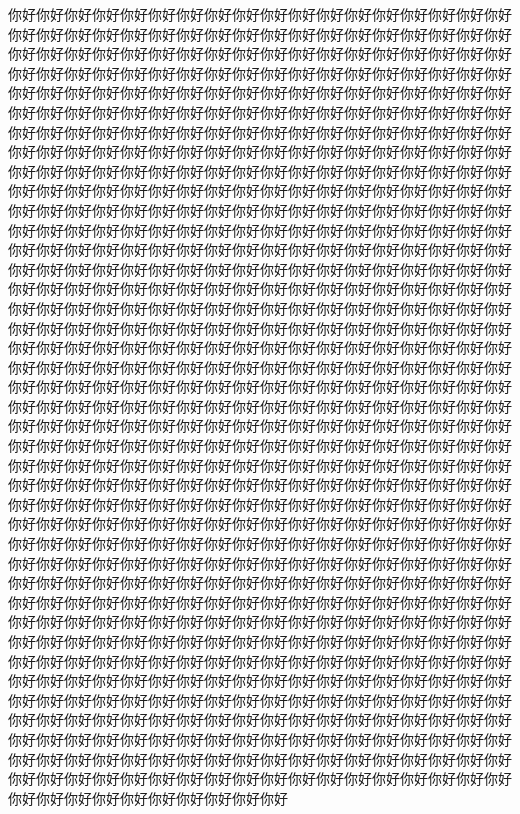 \documentclass[doctor,UTF8,hyperref]{../Template/scuthesis}
\begin{document}
\maketitle
你好你好你好你好你好你好你好你好你好你好你好你好你好你好你好你好你好你好你好你好你好你好你好你好你好你好你好你好你好你好你好你好你好你好你好你好你好你好你好你好你好你好你好你好你好你好你好你好你好你好你好你好你好你好你好你好你好你好你好你好你好你好你好你好你好你好你好你好你好你好你好你好你好你好你好你好你好你好你好你好你好你好你好你好你好你好你好你好你好你好你好你好你好你好你好你好你好你好你好你好你好你好你好你好你好你好你好你好你好你好你好你好你好你好你好你好你好你好你好你好你好你好你好你好你好你好你好你好你好你好你好你好你好你好你好你好你好你好你好你好你好你好你好你好你好你好你好你好你好你好你好你好你好你好你好你好你好你好你好你好你好你好你好你好你好你好你好你好你好你好你好你好你好你好你好你好你好你好你好你好你好你好你好你好你好你好你好你好你好你好你好你好你好你好你好你好你好你好你好你好你好你好你好你好你好你好你好你好你好你好你好你好你好你好你好你好你好你好你好你好你好你好你好你好你好你好你好你好你好你好你好你好你好你好你好你好你好你好你好你好你好你好你好你好你好你好你好你好你好你好你好你好你好你好你好你好你好你好你好你好你好你好你好你好你好你好你好你好你好你好你好你好你好你好你好你好你好你好你好你好你好你好你好你好你好你好你好你好你好你好你好你好你好你好你好你好你好你好你好你好你好你好你好你好你好你好你好你好你好你好你好你好你好你好你好你好你好你好你好你好你好你好你好你好你好你好你好你好你好你好你好你好你好你好你好你好你好你好你好你好你好你好你好你好你好你好你好你好你好你好你好你好你好你好你好你好你好你好你好你好你好你好你好你好你好你好你好你好你好你好你好你好你好你好你好你好你好你好你好你好你好你好你好你好你好你好你好你好你好你好你好你好你好你好你好你好你好你好你好你好你好你好你好你好你好你好你好你好你好你好你好你好你好你好你好你好你好你好你好你好你好你好你好你好你好你好你好你好你好你好你好你好你好你好你好你好你好你好你好你好你好你好你好你好你好你好你好你好你好你好你好你好你好你好你好你好你好你好你好你好你好你好你好你好你好你好你好你好你好你好你好你好你好你好你好你好你好你好你好你好你好你好你好你好你好你好你好你好你好你好你好你好你好你好你好你好你好你好你好你好你好你好你好你好你好你好你好你好你好你好你好你好你好你好你好你好你好你好你好你好你好你好你好你好你好你好你好你好你好你好你好你好你好你好你好你好你好你好你好你好你好你好你好你好你好你好你好你好你好你好你好你好你好你好你好你好你好你好你好你好你好你好你好你好你好你好你好你好你好你好你好你好你好你好你好你好你好你好你好你好你好你好你好你好你好你好你好你好你好你好你好你好你好你好你好你好你好你好你好你好你好你好你好你好你好你好你好你好你好你好你好你好你好你好你好你好你好你好你好你好你好你好你好你好你好你好你好你好你好你好你好你好你好你好你好你好你好你好你好你好你好你好你好你好你好你好你好你好你好你好你好你好你好你好你好你好你好你好你好你好你好你好你好你好你好你好你好你好你好你好你好你好你好你好你好你好你好你好你好你好你好你好你好你好你好你好你好你好你好你好你好你好你好你好你好你好你好你好你好你好你好你好你好你好你好你好你好你好你好你好你好你好你好你好你好你好你好你好你好你好你好你好你好你好你好你好你好你好你好你好
\end{document}
